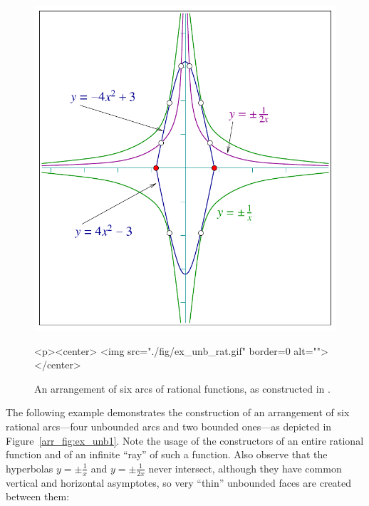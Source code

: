 \begin{figure}[h]
\begin{ccTexOnly}
  \begin{center}
  \includegraphics{Arrangement_on_surface_2/fig/ex_unb_rat}
  \end{center}
\end{ccTexOnly}
\begin{ccHtmlOnly}
  <p><center>
  <img src="./fig/ex_unb_rat.gif" border=0 alt="">
  </center>
\end{ccHtmlOnly}
\caption{An arrangement of six arcs of rational functions, as
constructed in
.\label{arr_fig:ex_unb_rat}}
\end{figure}

The following example demonstrates the construction of an
arrangement of six rational arcs---four unbounded arcs and two
bounded ones---as depicted in Figure~\ref{arr_fig:ex_unb1}. Note
the usage of the constructors of an entire rational function and of
an infinite ``ray'' of such a function. Also observe that the hyperbolas
$y = \pm\frac{1}{x}$ and $y = \pm\frac{1}{2x}$ never intersect, although
they have common vertical and horizontal asymptotes, so very ``thin''
unbounded faces are created between them:

